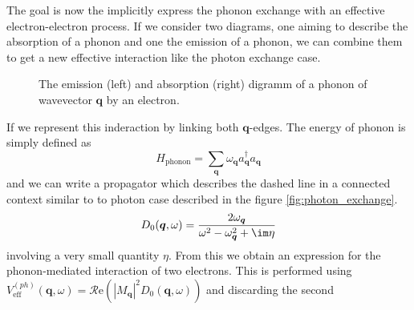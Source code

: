\documentclass[../main.tex]{subfile}
\begin{document}
The goal is now the implicitly express the phonon exchange with an effective electron-electron process. If we consider two diagrams, one aiming to describe the absorption of a phonon
and one the emission of a phonon, we can combine them to get a new effective interaction like the photon exchange case.
\begin{figure}[H]
    \centering
     \hspace{2cm}
    \caption{The emission (left) and absorption (right) digramm of a phonon of wavevector $\bm{q}$ by an electron.}
    \end{figure}
If we represent this inderaction by linking both $\bm{q}$-edges. The energy of phonon is simply defined as
\[
    H_{\text{phonon}} = \sum_{\bm{q}} \omega_{\bm{q}} a_{\bm{q}}^{\dagger}a_{\bm{q}}
\]
and we can write a propagator which describes the dashed line in a connected context similar to to photon case described in the figure \ref{fig:photon_exchange}.
\[
    D_0(\bm{q},\omega) = \frac{2\omega_{\bm{q}}}{\omega^2 - \omega_{\bm{q}}^2 + \im \eta}
\]
involving a very small quantity $\eta$. From this we obtain an expression for the phonon-mediated interaction of two electrons.
This is performed using $V^{(ph)}_{\text{eff}}(\bm{q},\omega) = \mathcal{R}\text{e}\left({|M_{\bm{q}}|^2 D_0(\bm{q},\omega)}\right)$ and discarding the second 
\end{document}
